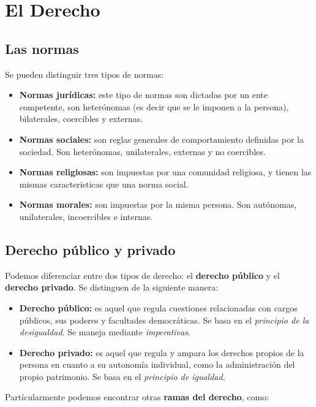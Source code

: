 \documentclass[../resumen.tex]{subfiles}
\begin{document}
\section{El Derecho}

\subsection{Las normas}

Se pueden distinguir tres tipos de normas:

\begin{itemize}
  \item \textbf{Normas jurídicas:} este tipo de normas son dictadas por un ente
    competente, son heterónomas (es decir que se le imponen a la persona), 
    bilaterales, coercibles y externas.
  \item \textbf{Normas sociales:} son reglas generales de comportamiento definidas
    por la sociedad. Son heterónomas, unilaterales, externas y no coercibles.
  \item \textbf{Normas religiosas:} son impuestas por una comunidad religiosa, y
    tienen las mismas caracteristicas que una norma social.
  \item \textbf{Normas morales:} son impuestas por la misma persona. Son autónomas,
    unilaterales, incoercibles e internas.
\end{itemize}

\subsection{Derecho público y privado}

Podemos diferenciar entre dos tipos de derecho: el \textbf{derecho público} y el
\textbf{derecho privado}. Se distinguen de la siguiente manera:

\begin{itemize}
  \item \textbf{Derecho público:} es aquel que regula cuestiones relacionadas con
    cargos públicos, sus poderes y facultades democráticas. Se basa en el 
    \textit{principio de la desigualdad}. Se maneja mediante \textit{imperativas}.
  \item \textbf{Derecho privado:} es aquel que regula y ampara los derechos propios
    de la persona en cuanto a su autonomía individual, como la administración del
    propio patrimonio. Se basa en el \textit{principio de igualdad.}
\end{itemize}

Partícularmente podemos encontrar otras \textbf{ramas del derecho}, como:
\end{document}
